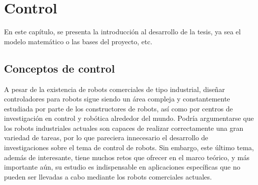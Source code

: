 

\chapter{\textcolor{Azul}{Control}}
En este capítulo, se presenta la introducción al desarrollo de la tesis, ya sea el modelo matemático o las bases del proyecto, etc.

\section{Conceptos de control}

A pesar de la existencia de robots comerciales de tipo industrial, diseñar controladores para robots sigue siendo un área compleja y constantemente estudiada por parte de los constructores de robots, así como por centros de investigación en control y robótica alrededor del mundo. Podría argumentarse que los robots industriales actuales son capaces de realizar correctamente una gran variedad de tareas, por lo que pareciera innecesario el desarrollo de investigaciones sobre el tema de control de robots. Sin embargo, este último tema, además de interesante, tiene muchos retos que ofrecer en el marco teórico, y más importante aún, su estudio es indispensable en aplicaciones específicas que no pueden ser llevadas a cabo mediante los robots comerciales actuales.\\

